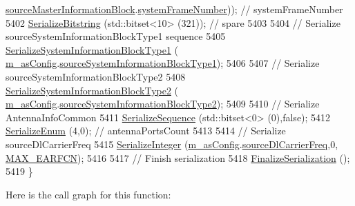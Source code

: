 \begin{DoxyCode}
      \hyperlink{structns3_1_1LteRrcSap_1_1AsConfig_a1588aaf39ff0a8898119529aec23d94a}{sourceMasterInformationBlock}.\hyperlink{structns3_1_1LteRrcSap_1_1MasterInformationBlock_a916d46a429b91317c9adfdd6f651f059}{systemFrameNumber})); \textcolor{comment}{//
       systemFrameNumber}
5402   \hyperlink{classns3_1_1Asn1Header_a0be8d507b87be07f85f35b906f8e5da7}{SerializeBitstring} (std::bitset<10> (321)); \textcolor{comment}{// spare}
5403 
5404   \textcolor{comment}{// Serialize sourceSystemInformationBlockType1 sequence}
5405   \hyperlink{classns3_1_1RrcAsn1Header_ac2da5b78bf99520a9ef23a796ce89008}{SerializeSystemInformationBlockType1} (
      \hyperlink{classns3_1_1HandoverPreparationInfoHeader_adfafc689e36800c0c59d495f74e3bdc1}{m\_asConfig}.\hyperlink{structns3_1_1LteRrcSap_1_1AsConfig_a5de40852fd35dbeeb19990a23ccf0a66}{sourceSystemInformationBlockType1});
5406 
5407   \textcolor{comment}{// Serialize sourceSystemInformationBlockType2}
5408   \hyperlink{classns3_1_1RrcAsn1Header_a47b40bb2492364bff8989e854c835ef1}{SerializeSystemInformationBlockType2} (
      \hyperlink{classns3_1_1HandoverPreparationInfoHeader_adfafc689e36800c0c59d495f74e3bdc1}{m\_asConfig}.\hyperlink{structns3_1_1LteRrcSap_1_1AsConfig_aaf68e6c66f6f3e8230a4f2dd720875a7}{sourceSystemInformationBlockType2});
5409 
5410   \textcolor{comment}{// Serialize AntennaInfoCommon }
5411   \hyperlink{classns3_1_1Asn1Header_aa9744858380443ed95836fed08799aed}{SerializeSequence} (std::bitset<0> (0),\textcolor{keyword}{false});
5412   \hyperlink{classns3_1_1Asn1Header_ac8e56956823ab8e4470c09e162e7bf24}{SerializeEnum} (4,0); \textcolor{comment}{// antennaPortsCount }
5413 
5414   \textcolor{comment}{// Serialize sourceDlCarrierFreq}
5415   \hyperlink{classns3_1_1Asn1Header_ab1c3bd37730affa7473bc759d625c29a}{SerializeInteger} (\hyperlink{classns3_1_1HandoverPreparationInfoHeader_adfafc689e36800c0c59d495f74e3bdc1}{m\_asConfig}.\hyperlink{structns3_1_1LteRrcSap_1_1AsConfig_ad69c57a616c9e8dba2cf6f1248c4eae3}{sourceDlCarrierFreq},0,
      \hyperlink{lte-rrc-header_8cc_a7851a91be0aab6446639f0ff8ee48b45}{MAX\_EARFCN});
5416 
5417   \textcolor{comment}{// Finish serialization}
5418   \hyperlink{classns3_1_1Asn1Header_a6c9bfaa54e5ca1a4eb8ea6c6b5550a8b}{FinalizeSerialization} ();
5419 \}
\end{DoxyCode}


Here is the call graph for this function\+:


